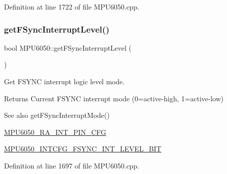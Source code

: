 Definition at line 1722 of file M\+P\+U6050.\+cpp.


\begin{DoxyCode}{0}

\end{DoxyCode}
\mbox{\label{classMPU6050_a60fc85d4f27f99d07ffb9543d5e5f347}} 
\subsubsection{\texorpdfstring{getFSyncInterruptLevel()}{getFSyncInterruptLevel()}}
{\footnotesize\ttfamily bool M\+P\+U6050\+::get\+F\+Sync\+Interrupt\+Level (\begin{DoxyParamCaption}{ }\end{DoxyParamCaption})}

Get F\+S\+Y\+NC interrupt logic level mode. \begin{DoxyReturn}{Returns}
Current F\+S\+Y\+NC interrupt mode (0=active-\/high, 1=active-\/low) 
\end{DoxyReturn}
\begin{DoxySeeAlso}{See also}
get\+F\+Sync\+Interrupt\+Mode() 

\mbox{\hyperlink{MPU6050_8h_a82344e1daef2bac2e0d938319528be6c}{M\+P\+U6050\+\_\+\+R\+A\+\_\+\+I\+N\+T\+\_\+\+P\+I\+N\+\_\+\+C\+FG}} 

\mbox{\hyperlink{MPU6050_8h_a1696357738f5b7e4bc50ec4170be3324}{M\+P\+U6050\+\_\+\+I\+N\+T\+C\+F\+G\+\_\+\+F\+S\+Y\+N\+C\+\_\+\+I\+N\+T\+\_\+\+L\+E\+V\+E\+L\+\_\+\+B\+IT}} 
\end{DoxySeeAlso}


Definition at line 1697 of file M\+P\+U6050.\+cpp.


